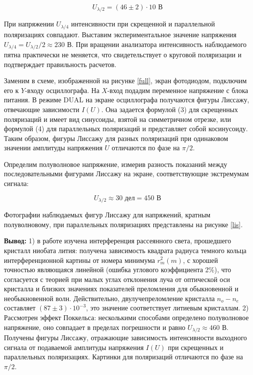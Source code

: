 \documentclass[12pt]{kiarticle}
\begin{document}
	\[ U_{\lambda/2} = (46 \pm 2) \cdot 10 \text{ В} \] 
	
	При напряжении $U_{\lambda/4}$ интенсивности при скрещенной и параллельной поляризациях совпадают. Выставим экспериментальное значение напряжения $U_{\lambda/4} = U_{\lambda/2}/2 \approx 230$ В. При вращении анализатора интенсивность наблюдаемого пятна практически не меняется, что свидетельствует о круговой поляризации и подтверждает правильность расчетов.  
	
	Заменим в схеме, изображенной на рисунке \ref{full}, экран фотодиодом, подключим его к $Y$-входу осциллографа. На $X$-вход подадим переменное напряжение с блока питания. В режиме DUAL на экране осциллографа получаются фигуры Лиссажу, отвечающие зависимости $I(U)$. Она задается формулой (3) для скрещенных поляризаций и имеет вид синусоиды, взятой на симметричном отрезке, или формулой (4) для параллельных поляризаций и представляет собой косинусоиду. Таким образом, фигуры Лиссажу для разных поляризаций при одинаковом значении амплитуды напряжения $U$ отличаются по фазе на $\pi/2$.
	
	Определим полуволновое напряжение, измерив разность показаний между последовательными фигурами Лиссажу на экране, соответствующие экстремумам сигнала: 
	
	\[ U_{\lambda/2} \approx 30 \text{ дел} = 450 \text{ В} \]
	
	Фотографии наблюдаемых фигур Лиссажу для напряжений, кратным полуволновому, при параллельных поляризациях представлены на рисунке \ref{lis}.
	
	\textbf{Вывод:} 1) в работе изучена интерференция рассеянного света, прошедшего кристалл ниобата лития: получена зависимость квадрата радиуса темного кольца интерференционной картины от номера минимума $r_m^2(m)$, с хорошей точностью являющаяся линейной (ошибка углового коэффициента 2\%), что согласуется с теорией при малых углах отклонения луча от оптической оси кристалла и близких значениях показателей преломления для обыкновенной и необыкновенной волн. Действительно, двулучепреломление кристалла $n_o - n_e$ составляет $(87 \pm 3)\cdot10^{-3}$, это значение соответствует литиевым кристаллам. 2) Рассмотрен эффект Поккельса: несколькими способами определено полуволновое напряжение, оно совпадает в пределах погрешности и равно $U_{\lambda/2} \approx 460$ В. Получены фигуры Лиссажу, отражающие зависимость интенсивности выходного сигнала от подаваемой амплитуды напряжения $I(U)$ при скрещенных и параллельных поляризациях. Картинки для поляризаций отличаются по фазе на $\pi/2$.
	
\end{document}
